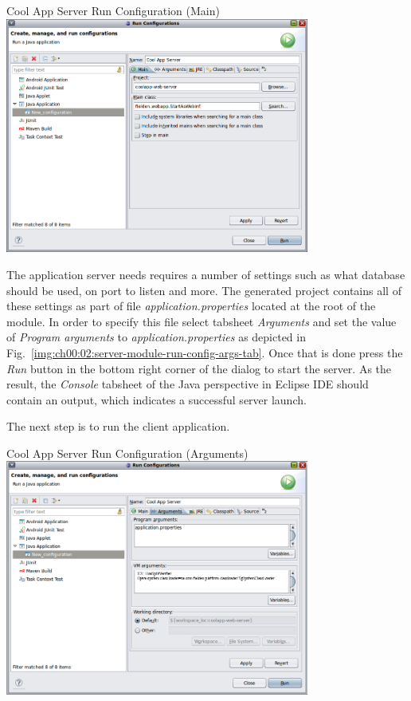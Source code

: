   \begin{image}{Cool App Server Run Configuration (Main)}{\label{img:ch00:02:server-module-run-config-main-tab}}    
    \includegraphics[width=0.75\textwidth]{parts/00-part/chapters/01-application-modules/images/13-server-module-run-config-main-tab.png}
  \end{image}

  The application server needs requires a number of settings such as what database should be used, on port to listen and more.
  The generated project contains all of these settings as part of file \emph{application.properties} located at the root of the module.
  In order to specify this file select tabsheet \emph{Arguments} and set the value of \emph{Program arguments} to \emph{application.properties} as depicted in Fig.~\ref{img:ch00:02:server-module-run-config-args-tab}.
  Once that is done press the \emph{Run} button in the bottom right corner of the dialog to start the server.
  As the result, the \emph{Console} tabsheet of the Java perspective in Eclipse IDE should contain an output, which indicates a successful server launch.

  The next step is to run the client application.
  
  \begin{image}{Cool App Server Run Configuration (Arguments)}{\label{img:ch00:02:server-module-run-config-args-tab}}    
    \includegraphics[width=0.75\textwidth]{parts/00-part/chapters/01-application-modules/images/14-server-module-run-config-arguments-tab.png}
  \end{image}

